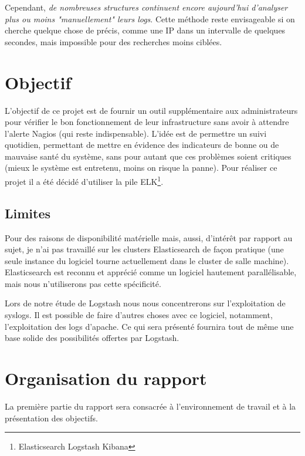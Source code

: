 \documentclass[a4paper,12pt,one side,titlepage]{report}
\begin{document}
Cependant, \emph{de nombreuses structures continuent encore aujourd'hui d'analyser 
plus ou moins "manuellement" leurs \textit{\gls{logs}}}. Cette méthode reste envisageable 
si on cherche quelque chose de précis, comme une IP dans un intervalle de quelques 
secondes, mais impossible pour des recherches moins ciblées.


\section{Objectif}
L'objectif de ce projet est de fournir un outil supplémentaire aux administrateurs
pour vérifier le bon fonctionnement de leur infrastructure sans avoir à attendre l'alerte
Nagios (qui reste indispensable). L'idée est de permettre un suivi quotidien, permettant
de mettre en évidence des indicateurs de bonne ou de mauvaise santé du système, sans 
pour autant que ces problèmes soient critiques (mieux le système est entretenu, moins
on risque la panne).
Pour réaliser ce projet il a été décidé d'utiliser la pile ELK\footnote{Elasticsearch Logstash Kibana}.



\subsection{Limites}
Pour des raisons de disponibilité matérielle mais, aussi, d'intérêt par rapport au sujet,
je n'ai pas travaillé sur les clusters Elasticsearch de façon pratique (une seule 
instance du logiciel tourne actuellement dans le cluster de salle machine). Elasticsearch
est reconnu et apprécié comme un logiciel hautement parallélisable, mais nous n'utiliserons
pas cette spécificité.



Lors de notre étude de Logstash nous nous concentrerons sur l'exploitation de syslogs. 
Il est possible de faire d'autres choses avec ce logiciel, notamment, 
l'exploitation des logs d'apache. 
Ce qui sera présenté fournira tout de même une base solide des possibilités offertes
par Logstash.


\section{Organisation du rapport}
La première partie du rapport sera consacrée à l'environnement de travail et à la 
présentation des objectifs. 
\end{document}
